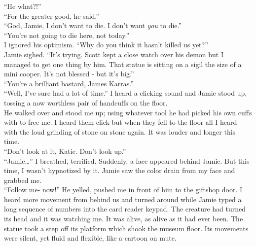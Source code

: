 \documentclass[a5paper]{scrartcl}
\begin{document}
\enquote{He what?!}\\


\enquote{For the greater good, he said.}\\


\enquote{God, Jamie, I don't want to die. I don't want \textit{you} to die.}\\


\enquote{You're not going to die here, not today.}\\


I ignored his optimism. \enquote{Why do you think it hasn't killed us yet?}\\


Jamie sighed. \enquote{It's trying. Scott kept a close watch over his demon but I managed to get one thing by him. That statue is sitting on a sigil the size of a mini cooper. It's not blessed - but it's big.}\\


\enquote{You're a brilliant bastard, James Karras.}\\


\enquote{Well, I've sure had a lot of time.} I heard a clicking sound and Jamie stood up, tossing a now worthless pair of handcuffs on the floor.\\


He walked over and stood me up; using whatever tool he had picked his own cuffs with to free me. I heard them click but when they fell to the floor all I heard with the loud grinding of stone on stone again. It was louder and longer this time.\\


\enquote{Don't look at it, Katie. Don't look up.}\\


\enquote{Jamie\dots } I breathed, terrified. Suddenly, a face appeared behind Jamie. But this time, I wasn't hypnotized by it. Jamie saw the color drain from my face and grabbed me.\\


\enquote{Follow me- now!} He yelled, pushed me in front of him to the giftshop door. I heard more movement from behind us and turned around while Jamie typed a long sequence of numbers into the card reader keypad. The creature had turned its head and it was watching me. It was alive, as alive as it had ever been. The statue took a step off its platform which shook the museum floor. Its movements were silent, yet fluid and flexible, like a cartoon on mute.\\
\end{document}

